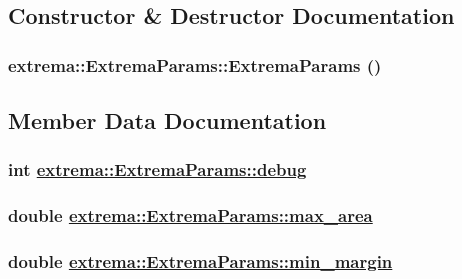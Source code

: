 \subsection{Constructor \& Destructor Documentation}
\hypertarget{structextrema_1_1ExtremaParams_8dbdb72d6460a8597dcb5ac435c65e6c}{
\subsubsection[ExtremaParams]{\setlength{\rightskip}{0pt plus 5cm}extrema::Extrema\-Params::Extrema\-Params ()}}
\label{structextrema_1_1ExtremaParams_8dbdb72d6460a8597dcb5ac435c65e6c}




\subsection{Member Data Documentation}
\hypertarget{structextrema_1_1ExtremaParams_0aa3f18a7996d4f26ae1fb2cd112f8b4}{
\subsubsection[debug]{\setlength{\rightskip}{0pt plus 5cm}int \hyperlink{structextrema_1_1ExtremaParams_0aa3f18a7996d4f26ae1fb2cd112f8b4}{extrema::Extrema\-Params::debug}}}
\label{structextrema_1_1ExtremaParams_0aa3f18a7996d4f26ae1fb2cd112f8b4}


\hypertarget{structextrema_1_1ExtremaParams_e63ee8f1dac673aa6fcf3709e3239b26}{
\subsubsection[max\_\-area]{\setlength{\rightskip}{0pt plus 5cm}double \hyperlink{structextrema_1_1ExtremaParams_e63ee8f1dac673aa6fcf3709e3239b26}{extrema::Extrema\-Params::max\_\-area}}}
\label{structextrema_1_1ExtremaParams_e63ee8f1dac673aa6fcf3709e3239b26}


\hypertarget{structextrema_1_1ExtremaParams_1b67eb9b4930123fe381830ee951e449}{
\subsubsection[min\_\-margin]{\setlength{\rightskip}{0pt plus 5cm}double \hyperlink{structextrema_1_1ExtremaParams_1b67eb9b4930123fe381830ee951e449}{extrema::Extrema\-Params::min\_\-margin}}}
\label{structextrema_1_1ExtremaParams_1b67eb9b4930123fe381830ee951e449}


